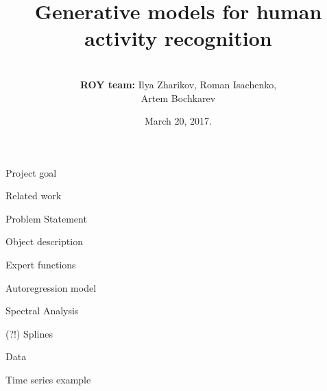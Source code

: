 \documentclass{beamer}
\title[\hbox to 56mm{Human Activity Recognition  \hfill\insertframenumber\,/\,\inserttotalframenumber}]
{Generative models for human activity recognition}
\author[ROY team]{\\
				{\small \textbf{ROY team:} Ilya Zharikov, Roman Isachenko, \\
					Artem Bochkarev}}
\institute[SkolTech]{Skolkovo Institute of Science and Technology \\
	Machine Learning course 
    \vspace{0.3cm}
}
\date{March 20, 2017.}
\begin{document}
\begin{frame}
\titlepage
\end{frame}
\begin{frame}{Project goal}
	
\end{frame}
\begin{frame}{Related work}
	
\end{frame}
\begin{frame}{Problem Statement}

\end{frame}
\begin{frame}{Object description}

\end{frame}
\begin{frame}{Expert functions}

\end{frame}
\begin{frame}{Autoregression model}

\end{frame}
\begin{frame}{Spectral Analysis}

\end{frame}
\begin{frame}{(?!) Splines}

\end{frame}
\begin{frame}{Data}

\end{frame}
\begin{frame}{Time series example}

\end{frame}
\end{document}
